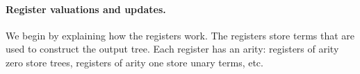 


\paragraph*{Register valuations and updates.} We begin by explaining how the registers work.  The registers store terms that are used to construct the output tree. Each register has an arity: registers of arity zero  store trees, registers of arity one store unary terms, etc.  

